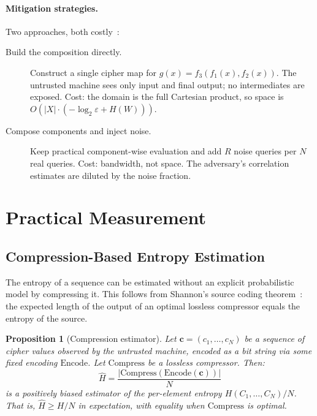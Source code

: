 \documentclass[11pt]{article}
\theoremstyle{definition}
\theoremstyle{plain}
\newtheorem{proposition}[theorem]{Proposition}
\theoremstyle{remark}
\begin{document}
\paragraph{Mitigation strategies.}
Two approaches, both costly~\cite[Sec.~9.2]{towell2026cipher}:

\begin{description}
\item[Build the composition directly.]  Construct a single cipher map for
  $g(x) = f_3(f_1(x), f_2(x))$.  The untrusted machine sees only
  input and final output; no intermediates are exposed.  Cost: the domain
  is the full Cartesian product, so space is
  $O(|X| \cdot (-\log_2 \varepsilon + H(W)))$.

\item[Compose components and inject noise.]  Keep practical
  component-wise evaluation and add $R$ noise queries per $N$ real
  queries.  Cost: bandwidth, not space.  The adversary's correlation
  estimates are diluted by the noise fraction.
\end{description}


\section{Practical Measurement}
\label{sec:measurement}

\subsection{Compression-Based Entropy Estimation}

The entropy of a sequence can be estimated without an explicit
probabilistic model by compressing it.  This follows from Shannon's
source coding theorem~\cite{shannon1948mathematical}: the expected length
of the output of an optimal lossless compressor equals the entropy of the
source.

\begin{proposition}[Compression estimator]
\label{prop:compression}
Let $\mathbf{c} = (c_1, \ldots, c_N)$ be a sequence of cipher values
observed by the untrusted machine, encoded as a bit string via some
fixed encoding $\mathrm{Encode}$.  Let $\mathrm{Compress}$ be a lossless
compressor.  Then:
\begin{equation}
\hat{H} = \frac{|\mathrm{Compress}(\mathrm{Encode}(\mathbf{c}))|}{N}
\end{equation}
is a positively biased estimator of the per-element entropy
$H(C_1, \ldots, C_N) / N$.  That is, $\hat{H} \geq H/N$ in expectation,
with equality when $\mathrm{Compress}$ is optimal.
\end{proposition}
\end{document}
